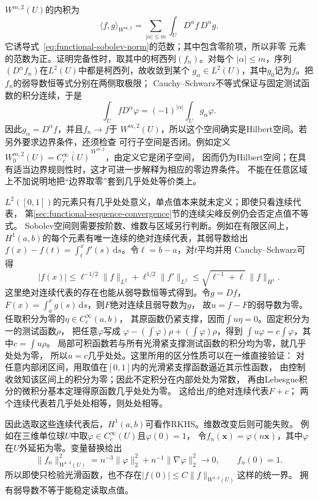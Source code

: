 $W^{m,2}(U)$的内积为
\[
 \langle f,g\rangle_{W^{m,2}}
 =\sum_{|\alpha|\leq m}\int_U D^\alpha f\,D^\alpha g.
\]
它诱导式~\eqref{eq:functional-sobolev-norm}的范数；其中包含零阶项，所以非零
元素的范数为正。证明完备性时，取其中的柯西列$(f_n)$。对每个
$|\alpha|\leq m$，序列$(D^\alpha f_n)$在$L^2(U)$中都是柯西列，故收敛到某个
$g_\alpha\in L^2(U)$，其中$g_0$记为$f$。把$f_n$的弱导数恒等式分别在两侧取极限；
Cauchy--Schwarz不等式保证与固定测试函数的积分连续，于是
\[
  \int_U fD^\alpha\varphi
  =
  (-1)^{|\alpha|}\int_U g_\alpha\varphi.
\]
因此$g_\alpha=D^\alpha f$，并且$f_n\to f$于
$W^{m,2}(U)$，所以这个空间确实是Hilbert空间。若另外要求边界条件，还须检查
可行子空间是否闭。例如定义
$W_0^{m,2}(U)=\overline{C_c^\infty(U)}^{\,W^{m,2}}$，由定义它是闭子空间，
因而仍为Hilbert空间；在具有适当边界规则性时，这才可进一步解释为相应的零边界条件。
不能在任意区域上不加说明地把“边界取零”套到几乎处处等价类上。

$L^2([0,1])$的元素只有几乎处处意义，单点值本来就未定义；即使只看连续代表，
第\ref{sec:functional-sequence-convergence}节的连续尖峰反例仍会否定点值不等式。
Sobolev空间则需要按阶数、维数与区域另行判断。例如在有限区间上，
$H^1(a,b)$的每个元素有唯一连续的绝对连续代表，其弱导数给出
$f(x)-f(t)=\int_t^x f'(s)\,\mathrm ds$。令$\ell=b-a$，对$t$平均并用
Cauchy--Schwarz可得
\[
 |f(x)|\leq \ell^{-1/2}\lVert f\rVert_{L^2}
              +\ell^{1/2}\lVert f'\rVert_{L^2}
 \leq\sqrt{\ell^{-1}+\ell}\,\lVert f\rVert_{H^1}.
\]
这里绝对连续代表的存在也能从弱导数恒等式得到。令$g=Df$，
$F(x)=\int_a^x g(s)\,\mathrm ds$，则$F$绝对连续且弱导数为$g$，
故$u=f-F$的弱导数为零。任取积分为零的$\eta\in C_c^\infty(a,b)$，
其原函数仍紧支撑，因而$\int u\eta=0$。固定积分为一的测试函数$\rho$，
把任意$\varphi$写成
$\varphi-(\int\varphi)\rho+(\int\varphi)\rho$，得到
$\int u\varphi=c\int\varphi$，其中$c=\int u\rho$。
局部可积函数若与所有光滑紧支撑测试函数的积分均为零，就几乎处处为零，
所以$u=c$几乎处处。这里所用的区分性质可以在一维直接验证：
对任意内部闭区间，用取值在$[0,1]$内的光滑紧支撑函数逼近其示性函数，
由控制收敛知该区间上的积分为零；因此不定积分在内部处处为常数，
再由Lebesgue积分的微积分基本定理得原函数几乎处处为零。
这给出$f$的绝对连续代表$F+c$；
两个连续代表若几乎处处相等，则处处相等。

因此选取这些连续代表后，$H^1(a,b)$可看作RKHS。维数改变后则可能失败。
例如在三维单位球$U$中取$\varphi\in C_c^\infty(U)$且$\varphi(0)=1$，
令$f_n(\bm x)=\varphi(n\bm x)$，其中$\varphi$在$U$外延拓为零。变量替换给出
\[
 \lVert f_n\rVert_{W^{1,2}(U)}^2
 =n^{-3}\lVert\varphi\rVert_2^2+
   n^{-1}\lVert\nabla\varphi\rVert_2^2\longrightarrow0,
 \qquad f_n(0)=1.
\]
所以即使只检验光滑函数，也不存在$|f(0)|\leq C\lVert f\rVert_{W^{1,2}(U)}$这样的统一界。
拥有弱导数不等于能稳定读取点值。


